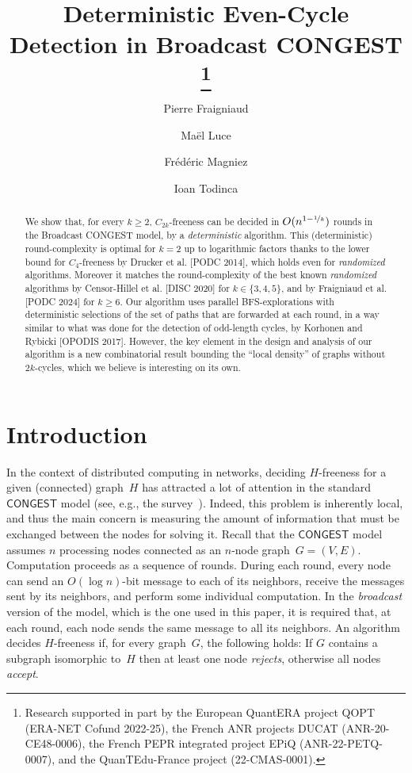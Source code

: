 \documentclass{article}
\title{Deterministic Even-Cycle Detection in Broadcast CONGEST
\thanks{Research supported in part by the 
European QuantERA project QOPT (ERA-NET Cofund 2022-25),
the French ANR projects DUCAT (ANR-20-CE48-0006),
the French PEPR integrated project EPiQ (ANR-22-PETQ-0007),
and the QuanTEdu-France project (22-CMAS-0001).}}
\author[1]{Pierre Fraigniaud}
\author[1]{Maël Luce}
\author[1]{Frédéric Magniez}
\author[2]{Ioan Todinca}
\affil[1]{
  {Université Paris Cité, CNRS, IRIF},
  {Paris},
  {France}
}
\affil[2]{
  {Université d'Orléans, INSA-Centre Val de Loire, LIFO},
 {Orléans},
  {France}   
}
\date{}
\newcommand{\CONGEST}{\textsf{CONGEST}}
\begin{document}
\maketitle

\begin{abstract}
We show that, for every $k\geq 2$, $C_{2k}$-freeness can be decided in $O(n^{1-\nicefrac{1}{k}})$ rounds in the Broadcast \CONGEST{} model, by a \emph{deterministic} algorithm. This (deterministic) round-complexity is optimal for $k=2$ up to logarithmic factors  thanks to the lower bound for $C_4$-freeness by Drucker et al. [PODC 2014], which holds even for \emph{randomized} algorithms. Moreover it matches the round-complexity of the best known \emph{randomized} algorithms by Censor-Hillel et al. [DISC 2020] for $k\in\{3,4,5\}$, and by Fraigniaud et al. [PODC 2024] for $k\geq 6$. Our algorithm uses parallel BFS-explorations with deterministic selections of the set of paths that are forwarded at each round, in a way similar to what was done for the detection of odd-length cycles, by Korhonen and Rybicki [OPODIS 2017]. However, the key element in the design and analysis of our algorithm is a new combinatorial result bounding the ``local density'' of graphs without $2k$-cycles, which  we believe is interesting on its own.
\end{abstract}


\section{Introduction}\label{sec:intro}


In the context of distributed computing in networks, deciding $H$-freeness for a given (connected) graph~$H$ has attracted a lot of attention in the standard $\CONGEST$ model (see, e.g., the survey~\cite{Censor-Hillel21}). Indeed, this problem is inherently local, and thus the main concern is measuring the amount of information that must be exchanged between the nodes for solving it. Recall that the $\CONGEST$ model~\cite{Peleg2000} assumes $n$ processing nodes connected as an $n$-node graph~$G=(V,E)$. Computation proceeds as a sequence of rounds. During each round, every node can send an $O(\log n)$-bit message to each of its neighbors, receive the messages sent by its neighbors, and perform some individual computation. In the \emph{broadcast} version of the model, which is the one used in this paper, it is required that, at each round, each node sends the same message to all its neighbors. An algorithm decides $H$-freeness if, for every graph~$G$, the following holds: If $G$ contains a subgraph isomorphic to~$H$ then at least one node \emph{rejects}, otherwise  all nodes \emph{accept}. 
\end{document}
